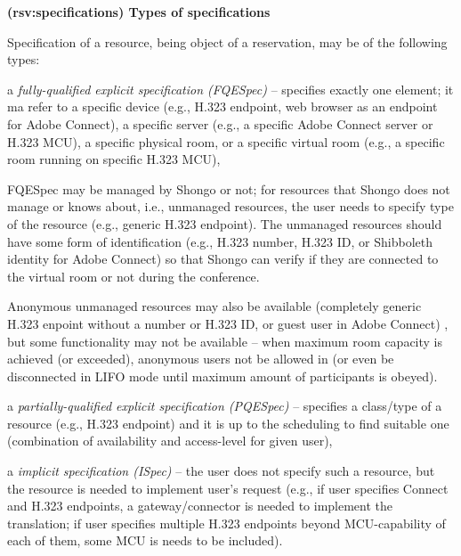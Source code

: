 \documentclass[a4paper]{report}
\makeatletter
\newcounter{UCcounter}
\newenvironment{UseCases}%
	{\begin{list}{\textbf{UC-\arabic{UCcounter}}}{\@nmbrlisttrue\def\@listctr{UCcounter}}}%
	{\end{list}}
\newcommand{\UClabel}[1]{\label{UC:#1}}
\newcommand{\UseCase}[2]{\item\UClabel{#2} \textbf{(#2) #1}\\ \nopagebreak}
\makeatother
\begin{document}
\begin{UseCases}

\UseCase{Types of specifications}{rsv:specifications}

Specification of a resource, being object of a reservation, may be of the
following types:

\begin{compactitem}

\item a \emph{fully-qualified explicit specification (FQESpec)} -- specifies
exactly one element; it ma refer to a specific device (e.g., H.323 endpoint,
web browser as an endpoint for Adobe Connect), a specific server (e.g., a
specific Adobe Connect server or H.323 MCU), a specific physical room, or a
specific virtual room (e.g., a specific room running on specific H.323 MCU),

FQESpec may be managed by Shongo or not; for resources that Shongo does not
manage or knows about, i.e., unmanaged resources, the user needs to specify
type of the resource (e.g., generic H.323 endpoint). The unmanaged resources
should have some form of identification (e.g., H.323 number, H.323 ID, or
Shibboleth identity for Adobe Connect) so that Shongo can verify if they are
connected to the virtual room or not during the conference.

Anonymous unmanaged resources may also be available (completely generic H.323
enpoint without a number or H.323 ID, or guest user in Adobe Connect) , but
some functionality may not be available -- when maximum room capacity is
achieved (or exceeded), anonymous users not be allowed in (or even be
disconnected in LIFO mode until maximum amount of participants is obeyed).


\item a \emph{partially-qualified explicit specification (PQESpec)} --
specifies a class/type of a resource (e.g., H.323 endpoint) and it is up to the
scheduling to find suitable one (combination of availability and access-level
for given user),

\item a \emph{implicit specification (ISpec)} -- the user does not specify such
a resource, but the resource is needed to implement user's request (e.g., if
user specifies Connect and H.323 endpoints, a gateway/connector is needed to
implement the translation; if user specifies multiple H.323 endpoints beyond
MCU-capability of each of them, some MCU is needs to be included).

\end{compactitem}


\end{UseCases}
\end{document}
